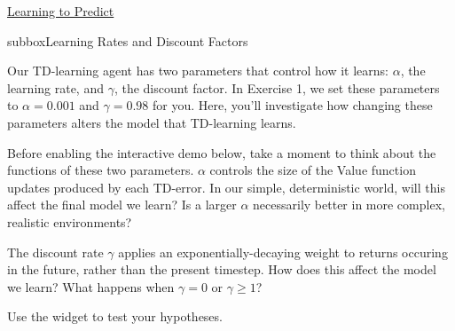 \begin{textbox}{\href{https://compneuro.neuromatch.io/tutorials/W3D4_ReinforcementLearning/student/W3D4_Tutorial1.html}{Learning to Predict } }
\begin{subbox}{subbox}{Learning Rates and Discount Factors}
\scriptsize


Our TD-learning agent has two parameters that control how it learns: $\alpha$, the learning rate, and $\gamma$, the discount factor. In Exercise 1, we set these parameters to $\alpha=0.001$ and $\gamma=0.98$ for you. Here, you'll investigate how changing these parameters alters the model that TD-learning learns.

Before enabling the interactive demo below, take a moment to think about the functions of these two parameters. $\alpha$ controls the size of the Value function updates produced by each TD-error. In our simple, deterministic world, will this affect the final model we learn? Is a larger $\alpha$ necessarily better in more complex, realistic environments?

The discount rate $\gamma$ applies an exponentially-decaying weight to returns occuring in the future, rather than the present timestep. How does this affect the model we learn? What happens when $\gamma=0$ or $\gamma \geq 1$?

Use the widget to test your hypotheses.

\begin{center}
    

\end{center}
\end{subbox}
\end{textbox}
